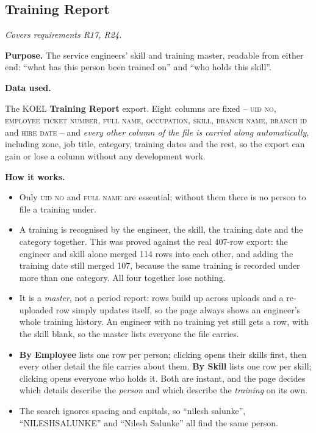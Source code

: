 \documentclass[11pt,a4paper]{article}
\newcommand{\covers}[1]{\textit{Covers requirements #1.}\par}
\newcommand{\purpose}[1]{\textbf{Purpose.} #1\par}
\newcommand{\dataused}{\textbf{Data used.}\par}
\newcommand{\devproc}{\textbf{How it works.}\par}
\newcommand{\col}[1]{\textsc{\small #1}}
\newcommand{\qt}[1]{\textquotedblleft #1\textquotedblright}
\begin{document}
\subsection{Training Report}
\covers{R17, R24}

\purpose{The service engineers' skill and training master, readable from either end:
\qt{what has this person been trained on} and \qt{who holds this skill}.}

\dataused
The KOEL \textbf{Training Report} export. Eight columns are fixed -- \col{uid no},
\col{employee ticket number}, \col{full name}, \col{occupation}, \col{skill},
\col{branch name}, \col{branch id} and \col{hire date} -- and \emph{every other column
of the file is carried along automatically}, including zone, job title, category,
training dates and the rest, so the export can gain or lose a column without any
development work.

\devproc
\begin{itemize}
  \item Only \col{uid no} and \col{full name} are essential; without them there is no
  person to file a training under.
  \item A training is recognised by the engineer, the skill, the training date and the
  category together. This was proved against the real 407-row export: the engineer and
  skill alone merged 114 rows into each other, and adding the training date still merged
  107, because the same training is recorded under more than one category. All four
  together lose nothing.
  \item It is a \emph{master}, not a period report: rows build up across uploads and a
  re-uploaded row simply updates itself, so the page always shows an engineer's whole
  training history. An engineer with no training yet still gets a row, with the skill
  blank, so the master lists everyone the file carries.
  \item \textbf{By Employee} lists one row per person; clicking opens their skills first,
  then every other detail the file carries about them. \textbf{By Skill} lists one row
  per skill; clicking opens everyone who holds it. Both are instant, and the page decides
  which details describe the \emph{person} and which describe the \emph{training} on its
  own.
  \item The search ignores spacing and capitals, so \qt{nilesh salunke},
  \qt{NILESHSALUNKE} and \qt{Nilesh  Salunke} all find the same person.
\end{itemize}
\end{document}

